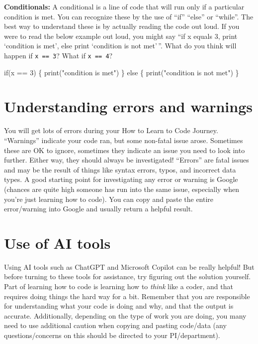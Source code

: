 \documentclass[
  letterpaper,
  DIV=11,
  numbers=noendperiod]{scrreprt}
\newenvironment{Shaded}{\begin{snugshade}}{\end{snugshade}}
\newcommand{\ControlFlowTok}[1]{\textcolor[rgb]{0.00,0.23,0.31}{#1}}
\newcommand{\DecValTok}[1]{\textcolor[rgb]{0.68,0.00,0.00}{#1}}
\newcommand{\FunctionTok}[1]{\textcolor[rgb]{0.28,0.35,0.67}{#1}}
\newcommand{\NormalTok}[1]{\textcolor[rgb]{0.00,0.23,0.31}{#1}}
\newcommand{\SpecialCharTok}[1]{\textcolor[rgb]{0.37,0.37,0.37}{#1}}
\newcommand{\StringTok}[1]{\textcolor[rgb]{0.13,0.47,0.30}{#1}}
\begin{document}
\textbf{Conditionals:} A conditional is a line of code that will run
only if a particular condition is met. You can recognize these by the
use of ``if'' ``else'' or ``while''. The best way to understand these is
by actually reading the code out loud. If you were to read the below
example out loud, you might say ``if x equals 3, print `condition is
met', else print `condition is not met'\,''. What do you think will
happen if \texttt{x\ ==\ 3}? What if \texttt{x\ ==\ 4}?

\begin{Shaded}
\begin{Highlighting}[]
\ControlFlowTok{if}\NormalTok{(x }\SpecialCharTok{==} \DecValTok{3}\NormalTok{) \{}
  \FunctionTok{print}\NormalTok{(}\StringTok{"condition is met"}\NormalTok{)}
\NormalTok{\} }\ControlFlowTok{else}\NormalTok{ \{}
  \FunctionTok{print}\NormalTok{(}\StringTok{"condition is not met"}\NormalTok{)}
\NormalTok{\}}
\end{Highlighting}
\end{Shaded}

\hypertarget{understanding-errors-and-warnings}{%
\section{Understanding errors and
warnings}\label{understanding-errors-and-warnings}}

You will get lots of errors during your How to Learn to Code Journey.
``Warnings'' indicate your code ran, but some non-fatal issue arose.
Sometimes these are OK to ignore, sometimes they indicate an issue you
need to look into further. Either way, they should always be
investigated! ``Errors'' are fatal issues and may be the result of
things like syntax errors, typos, and incorrect data types. A good
starting point for investigating any error or warning is Google (chances
are quite high someone has run into the same issue, especially when
you're just learning how to code). You can copy and paste the entire
error/warning into Google and usually return a helpful result.

\hypertarget{use-of-ai-tools}{%
\section{Use of AI tools}\label{use-of-ai-tools}}

Using AI tools such as ChatGPT and Microsoft Copilot can be really
helpful! But before turning to these tools for assistance, try figuring
out the solution yourself. Part of learning how to code is learning how
to \emph{think} like a coder, and that requires doing things the hard
way for a bit. Remember that you are responsible for understanding what
your code is doing and why, and that the output is accurate.
Additionally, depending on the type of work you are doing, you many need
to use additional caution when copying and pasting code/data (any
questions/concerns on this should be directed to your PI/department).
\end{document}
